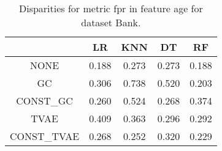 \begin{table}
\caption{Disparities for metric fpr in feature age for dataset Bank.}
\label{tab:disp-BANK-age-fpr}
\begin{tabular}{ccccc}
\toprule
 & LR & KNN & DT & RF \\
\midrule
NONE & 0.188 & 0.273 & 0.273 & 0.188 \\
GC & 0.306 & 0.738 & 0.520 & 0.203 \\
CONST\_GC & 0.260 & 0.524 & 0.268 & 0.374 \\
TVAE & 0.409 & 0.363 & 0.296 & 0.292 \\
CONST\_TVAE & 0.268 & 0.252 & 0.320 & 0.229 \\
\bottomrule
\end{tabular}
\end{table}
